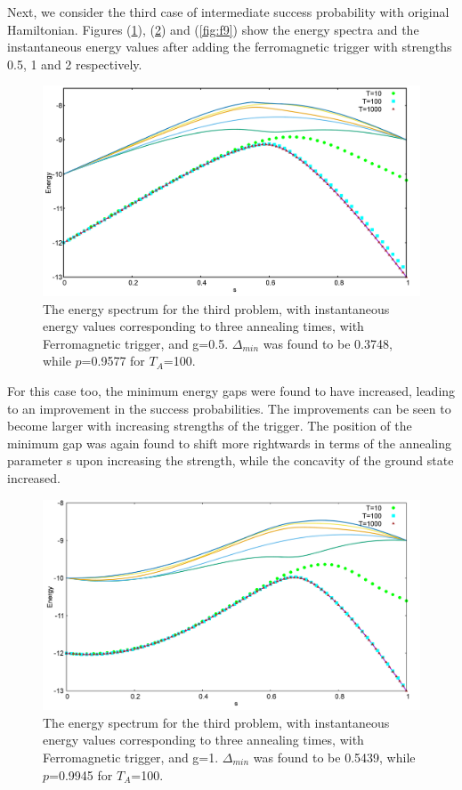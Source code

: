 \documentclass[../main.tex]{subfiles}
\begin{document}
Next, we consider the third case of intermediate success probability with original Hamiltonian. Figures (\ref{fig:f7}), (\ref{fig:f8}) and (\ref{fig:f9}) show the energy spectra and the instantaneous energy values after adding the ferromagnetic trigger with strengths 0.5, 1 and 2 respectively.
\begin{figure}[H]
\centering 
\includegraphics[scale=0.3]{528_s12_F_g0.png}
\caption{The energy spectrum for the third problem, with instantaneous energy values corresponding to three annealing times, with Ferromagnetic trigger, and g=0.5. $\Delta_{min}$ was found to be 0.3748, while $p$=0.9577 for $T_A$=100.}
\label{fig:f7}
\end{figure}
For this case too, the minimum energy gaps were found to have increased, leading to an improvement in the success probabilities. The improvements can be seen to become larger with increasing strengths of the trigger. The position of the minimum gap was again found to shift more rightwards in terms of the annealing parameter s upon increasing the strength, while the concavity of the ground state increased. \\
\begin{figure}[H]
\centering 
\includegraphics[scale=0.3]{528_s12_F_g1.png}
\caption{The energy spectrum for the third problem, with instantaneous energy values corresponding to three annealing times, with Ferromagnetic trigger, and g=1. $\Delta_{min}$ was found to be 0.5439, while $p$=0.9945 for $T_A$=100.}
\label{fig:f8}
\end{figure}
\end{document}
